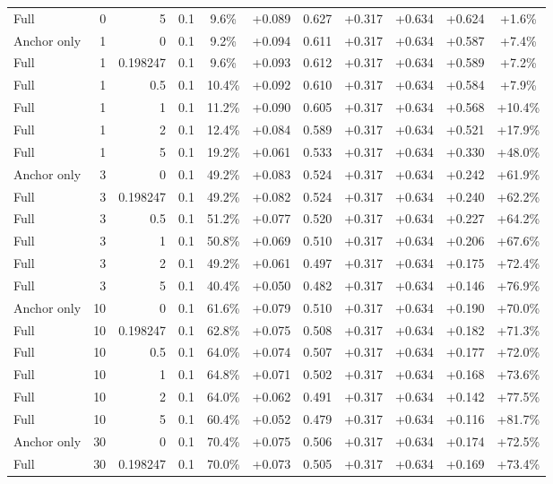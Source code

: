 \begin{table}[htbp]
\begin{tabular}{lrrrccccccc}
Full & 0 & 5 & 0.1 & 9.6\% & +0.089 & 0.627 & +0.317 & +0.634 & +0.624 & +1.6\% \\
Anchor only & 1 & 0 & 0.1 & 9.2\% & +0.094 & 0.611 & +0.317 & +0.634 & +0.587 & +7.4\% \\
Full & 1 & 0.198247 & 0.1 & 9.6\% & +0.093 & 0.612 & +0.317 & +0.634 & +0.589 & +7.2\% \\
Full & 1 & 0.5 & 0.1 & 10.4\% & +0.092 & 0.610 & +0.317 & +0.634 & +0.584 & +7.9\% \\
Full & 1 & 1 & 0.1 & 11.2\% & +0.090 & 0.605 & +0.317 & +0.634 & +0.568 & +10.4\% \\
Full & 1 & 2 & 0.1 & 12.4\% & +0.084 & 0.589 & +0.317 & +0.634 & +0.521 & +17.9\% \\
Full & 1 & 5 & 0.1 & 19.2\% & +0.061 & 0.533 & +0.317 & +0.634 & +0.330 & +48.0\% \\
Anchor only & 3 & 0 & 0.1 & 49.2\% & +0.083 & 0.524 & +0.317 & +0.634 & +0.242 & +61.9\% \\
Full & 3 & 0.198247 & 0.1 & 49.2\% & +0.082 & 0.524 & +0.317 & +0.634 & +0.240 & +62.2\% \\
Full & 3 & 0.5 & 0.1 & 51.2\% & +0.077 & 0.520 & +0.317 & +0.634 & +0.227 & +64.2\% \\
Full & 3 & 1 & 0.1 & 50.8\% & +0.069 & 0.510 & +0.317 & +0.634 & +0.206 & +67.6\% \\
Full & 3 & 2 & 0.1 & 49.2\% & +0.061 & 0.497 & +0.317 & +0.634 & +0.175 & +72.4\% \\
Full & 3 & 5 & 0.1 & 40.4\% & +0.050 & 0.482 & +0.317 & +0.634 & +0.146 & +76.9\% \\
Anchor only & 10 & 0 & 0.1 & 61.6\% & +0.079 & 0.510 & +0.317 & +0.634 & +0.190 & +70.0\% \\
Full & 10 & 0.198247 & 0.1 & 62.8\% & +0.075 & 0.508 & +0.317 & +0.634 & +0.182 & +71.3\% \\
Full & 10 & 0.5 & 0.1 & 64.0\% & +0.074 & 0.507 & +0.317 & +0.634 & +0.177 & +72.0\% \\
Full & 10 & 1 & 0.1 & 64.8\% & +0.071 & 0.502 & +0.317 & +0.634 & +0.168 & +73.6\% \\
Full & 10 & 2 & 0.1 & 64.0\% & +0.062 & 0.491 & +0.317 & +0.634 & +0.142 & +77.5\% \\
Full & 10 & 5 & 0.1 & 60.4\% & +0.052 & 0.479 & +0.317 & +0.634 & +0.116 & +81.7\% \\
Anchor only & 30 & 0 & 0.1 & 70.4\% & +0.075 & 0.506 & +0.317 & +0.634 & +0.174 & +72.5\% \\
Full & 30 & 0.198247 & 0.1 & 70.0\% & +0.073 & 0.505 & +0.317 & +0.634 & +0.169 & +73.4\% \\

\end{tabular}
\end{table}
